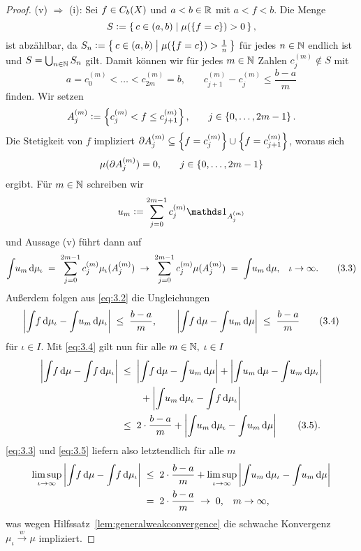 \documentclass[../main/main.tex]{subfiles}
\begin{document}
\begin{proof}
		(v) $\Rightarrow$ (i): Sei $f \in C_b(X)$ und $a < b \in \mathbb{R}$ 
		mit $a < f < b$. Die Menge
		$$S \vcentcolon = \left\{\, c \in (a, b) \; \middle| \; \mu(\left\{f = c\right\}) > 0 \,\right\} \text{,}$$
		ist abzählbar, da 
		$S_n \vcentcolon = \left\{\, c \in (a, b) \; \middle| \; \mu(\left\{f = c\right\}) > \frac{1}{n} \,\right\}$ 
		für jedes $n \in \mathbb{N}$ endlich ist und $S = \bigcup_{n \in \mathbb{N}} S_n$ gilt.
		Damit können wir für jedes $m \in \mathbb{N}$ Zahlen $c_j^{(m)} \notin S$ mit
		\[a = c_0^{(m)} < \dots < c_{2m}^{(m)} = 
		b \text{,} \qquad c_{j+1}^{(m)} - c_j^{(m)} \leq \frac{b-a}{m} 
		\label{eq:3.2} \tag{3.2}\]
		finden. Wir setzen
		$$A_j^{(m)} \vcentcolon = \left\{c_j^{(m)} < f \leq c_{j+1}^{(m)}\right\}\text{,}
		\qquad j \in \left\{0,\dots,2m-1\right\} \text{.}$$ 
		Die Stetigkeit von $f$ impliziert 
		$\partial A_j^{(m)} \subseteq \left\{f = c_j^{(m)}\right\} \cup \left\{f = c_{j+1}^{(m)}\right\}$, 
		woraus sich 
		$$\mu(\partial A_j^{(m)}) = 0 \text{,} \qquad j \in \left\{0,\dots,2m-1\right\}$$
		ergibt. Für $m \in \mathbb{N}$ schreiben wir
		$$u_m \defby \sum_{j=0}^{2m-1} c_j^{(m)} \indfct_{A_j^{(m)}}$$
		und Aussage (v) führt dann auf
		\[\int_{} \, u_m \, \mathrm{d}\mu_\iota \; = \; \sum_{j=0}^{2m-1} c_j^{(m)} \mu_\iota(A_j^{(m)}) 
		\; \to \; \sum_{j=0}^{2m-1} c_j^{(m)} \mu(A_j^{(m)}) \; = \; 
		\int_{} \, u_m \, \mathrm{d}\mu \text{,} \quad \iota \to \infty \text{.} 
		\label{eq:3.3} \tag{3.3}\]
		Außerdem folgen aus \eqref{eq:3.2} die Ungleichungen
		\[\left| \int_{} \, f \, \mathrm{d}\mu_\iota - \int_{} \, u_m \, \mathrm{d}\mu_\iota \right| \; \leq \; 
		\frac{b-a}{m} \text{,} \qquad 
		\left| \int_{} \, f \, \mathrm{d}\mu - \int_{} \, u_m \, \mathrm{d}\mu \right| \; \leq \; 
		\frac{b-a}{m} \label{eq:3.4} \tag{3.4}\]
		für $\iota \in I$.
		Mit \eqref{eq:3.4} gilt nun für alle $m \in \mathbb{N}, \; \iota \in I$
		\begin{align*}
			\left| \int_{} \, f \, \mathrm{d}\mu - \int_{} \, f \, \mathrm{d}\mu_\iota \right| \; &\leq \; 
			\left| \int_{} \, f \, \mathrm{d}\mu - \int_{} \, u_m \, \mathrm{d}\mu \right| + 
			\left| \int_{} \, u_m \, \mathrm{d}\mu - \int_{} \, u_m \, \mathrm{d}\mu_\iota \right| \\ & \qquad + 
			\left| \int_{} \, u_m \, \mathrm{d}\mu_\iota - \int_{} \, f \, \mathrm{d}\mu_\iota \right| \\
			&\leq \; 2 \cdot \frac{b-a}{m} + \left| \int_{} \, u_m \, \mathrm{d}\mu_\iota - 
			\int_{} \, u_m \, \mathrm{d}\mu \right| \label{eq:3.5} \tag{3.5}\text{.}
		\end{align*}
		\eqref{eq:3.3} und \eqref{eq:3.5} liefern also letztendlich für alle $m$
		\begin{align*}
			\limsup_{\iota \to \infty} \left| \int_{} \, f \, \mathrm{d}\mu - 
			\int_{} \, f \, \mathrm{d}\mu_\iota \right|
			\; &\leq \; 2 \cdot \frac{b-a}{m} + 
			\limsup_{\iota \to \infty} \left| \int_{} \, u_m \, \mathrm{d}\mu_\iota - 
			\int_{} \, u_m \, \mathrm{d}\mu \right| \\
			&= \; 2 \cdot \frac{b-a}{m} \; \to \; 0 \text{,} 
			\quad m \to \infty \text{,}
		\end{align*}
		was wegen Hilfssatz~\ref{lem:generalweakconvergence} die schwache Konvergenz $\mu_\iota \xrightarrow{w} \mu$ impliziert.
	\end{proof}
\end{document}
